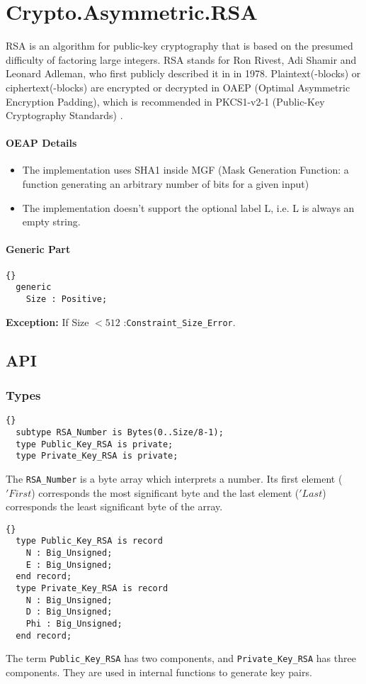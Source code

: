 \chapter{Crypto.Asymmetric.RSA}
RSA is an algorithm for public-key cryptography that is based on the
presumed difficulty of factoring large integers. RSA stands for Ron
Rivest, Adi Shamir and Leonard Adleman, who first publicly described
it in \cite{PKCS} in 1978. Plaintext(-blocks) or ciphertext(-blocks)
are encrypted or decrypted in OAEP (Optimal Asymmetric Encryption
Padding), which is recommended in PKCS1-v2-1 (Public-Key Cryptography
Standards) \cite{PKCS}.
\subsubsection*{OEAP Details}
\begin{itemize}
\item The implementation uses SHA1 inside MGF (Mask Generation
  Function: a function generating an arbitrary number of bits for a
  given input)
\item The implementation doesn't support the optional label L, i.e. L
  is always an empty string.
\end{itemize}
\subsubsection*{Generic Part}
\begin{lstlisting}{}
  generic
    Size : Positive;
\end{lstlisting}
\textbf{Exception:} If Size $< 512$ :\quad \texttt{Constraint\_Size\_Error}.\\
\section{API}
\subsection*{Types}
\begin{lstlisting}{}
  subtype RSA_Number is Bytes(0..Size/8-1);
  type Public_Key_RSA is private;
  type Private_Key_RSA is private;
\end{lstlisting}
The \texttt{RSA\_Number} is a byte array which interprets a
number. Its first element ($'First$) corresponds the most significant
byte and the last element ($'Last$) corresponds the least significant
byte of the array.\\
\begin{lstlisting}{}
  type Public_Key_RSA is record
    N : Big_Unsigned;
    E : Big_Unsigned;
  end record;
  type Private_Key_RSA is record
    N : Big_Unsigned;
    D : Big_Unsigned;
    Phi : Big_Unsigned;
  end record;
\end{lstlisting}
The term \texttt{Public\_Key\_RSA} has two components, and
\texttt{Private\_Key\_RSA} has three components. They are used in
internal functions to generate key pairs.\\
